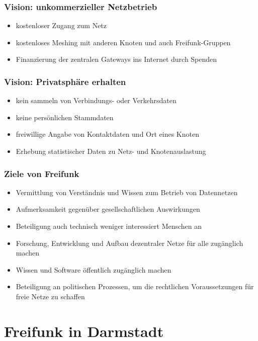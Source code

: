 \documentclass[handout, 10pt]{beamer}
\begin{document}
\begin{frame}
	\frametitle{Vision: unkommerzieller Netzbetrieb}
	
	\begin{itemize}[<+->]
		\item kostenloser Zugang zum Netz
		\item kostenloses Meshing mit anderen Knoten und auch Freifunk-Gruppen
		\item Finanzierung der zentralen Gateways ins Internet durch Spenden
	\end{itemize}
\end{frame}

\begin{frame}
	\frametitle{Vision: Privatsphäre erhalten}
	
	\begin{itemize}[<+->]
		\item kein sammeln von Verbindungs- oder Verkehrsdaten
		\item keine persönlichen Stammdaten
		\item freiwillige Angabe von Kontaktdaten und Ort eines Knoten
		\item Erhebung statistischer Daten zu Netz- und Knotenauslastung
	\end{itemize}
\end{frame}

\begin{frame}
	\frametitle{Ziele von Freifunk}
	\begin{itemize}[<+->]
		\item Vermittlung von Verständnis und Wissen zum Betrieb von Datennetzen
		\item Aufmerksamkeit gegenüber gesellschaftlichen Auswirkungen
		\item Beteiligung auch technisch weniger interessiert Menschen an 
		\item Forschung, Entwicklung und Aufbau dezentraler Netze für alle zugänglich machen
		\item Wissen und Software öffentlich zugänglich machen
		\item Beteiligung an politischen Prozessen, um die rechtlichen Voraussetzungen für freie Netze zu schaffen
	\end{itemize}
\end{frame}


\section{Freifunk in Darmstadt}
\end{document}
